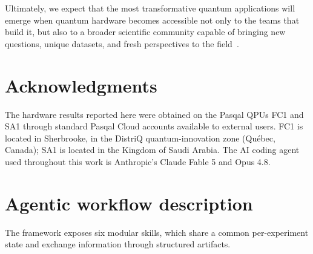 \documentclass[aps,pra,reprint,amssymb,superscriptaddress,nofootinbib,floatfix]{revtex4-2}
\begin{document}
Ultimately, we expect that the most transformative quantum applications will emerge when quantum hardware becomes accessible not only to the teams that build it, but also to a broader scientific community capable of bringing new questions, unique datasets, and fresh perspectives to the field~\cite{jurczak2026qoulipo}.




\vspace*{\baselineskip}

\section*{Acknowledgments}
The hardware results reported here were obtained on the Pasqal QPUs FC1 and SA1 through standard Pasqal Cloud accounts available to external users. FC1 is located in Sherbrooke, in the DistriQ quantum-innovation zone (Québec, Canada); SA1 is located in the Kingdom of Saudi Arabia. The AI coding agent used throughout this work is Anthropic's Claude Fable 5 and Opus 4.8.
\appendix

\section{Agentic workflow description}
\label{app:workflow}
The framework exposes six modular skills, which share a common per-experiment state and exchange information through structured artifacts.
\end{document}
